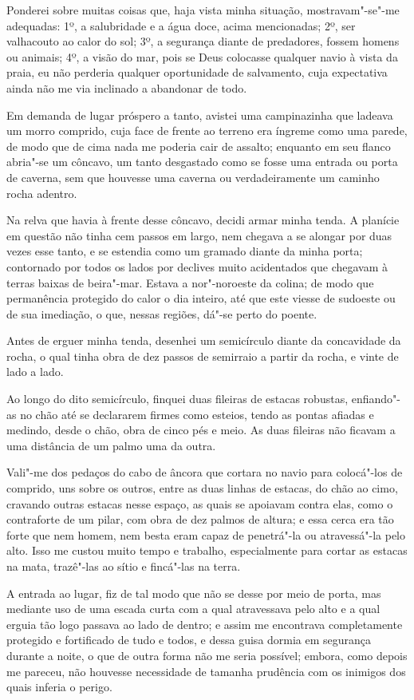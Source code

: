 Ponderei sobre muitas coisas que, haja vista minha situação,
mostravam"-se"-me adequadas: 1º, a salubridade e a água doce, acima
mencionadas; 2º, ser valhacouto ao calor do sol; 3º, a segurança diante
de predadores, fossem homens ou animais; 4º, a visão do mar, pois se
Deus colocasse qualquer navio à vista da praia, eu não perderia qualquer
oportunidade de salvamento, cuja expectativa ainda não me via inclinado
a abandonar de todo.

Em demanda de lugar próspero a tanto, avistei uma campinazinha que
ladeava um morro comprido, cuja face de frente ao terreno era íngreme
como uma parede, de modo que de cima nada me poderia cair de assalto;
enquanto em seu flanco abria"-se um côncavo, um tanto desgastado como se
fosse uma entrada ou porta de caverna, sem que houvesse uma caverna ou
verdadeiramente um caminho rocha adentro.

Na relva que havia à frente desse côncavo, decidi armar minha tenda. A
planície em questão não tinha cem passos em largo, nem chegava a se
alongar por duas vezes esse tanto, e se estendia como um gramado diante
da minha porta; contornado por todos os lados por declives muito
acidentados que chegavam à terras baixas de beira"-mar. Estava a
nor"-noroeste da colina; de modo que permanência protegido do calor o dia
inteiro, até que este viesse de sudoeste ou de sua imediação, o que,
nessas regiões, dá"-se perto do poente.

Antes de erguer minha tenda, desenhei um semicírculo diante da
concavidade da rocha, o qual tinha obra de dez passos de semirraio a
partir da rocha, e vinte de lado a lado.

Ao longo do dito semicírculo, finquei duas fileiras de estacas robustas,
enfiando"-as no chão até se declararem firmes como esteios, tendo as
pontas afiadas e medindo, desde o chão, obra de cinco pés e meio. As
duas fileiras não ficavam a uma distância de um palmo uma da outra.

Vali"-me dos pedaços do cabo de âncora que cortara no navio para
colocá"-los de comprido, uns sobre os outros, entre as duas linhas de
estacas, do chão ao cimo, cravando outras estacas nesse espaço, as quais
se apoiavam contra elas, como o contraforte de um pilar, com obra de dez
palmos de altura; e essa cerca era tão forte que nem homem, nem besta
eram capaz de penetrá"-la ou atravessá"-la pelo alto. Isso me custou muito
tempo e trabalho, especialmente para cortar as estacas na mata,
trazê"-las ao sítio e fincá"-las na terra.

A entrada ao lugar, fiz de tal modo que não se desse por meio de porta,
mas mediante uso de uma escada curta com a qual atravessava pelo alto e
a qual erguia tão logo passava ao lado de dentro; e assim me encontrava
completamente protegido e fortificado de tudo e todos, e dessa guisa
dormia em segurança durante a noite, o que de outra forma não me seria
possível; embora, como depois me pareceu, não houvesse necessidade de
tamanha prudência com os inimigos dos quais inferia o perigo.

